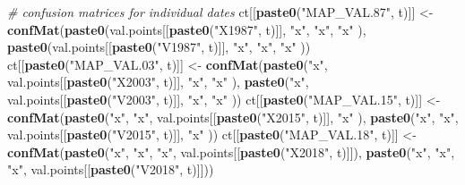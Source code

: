 \documentclass[a4paper, notitlepage, 12pt, krantz2]{krantz}
\newenvironment{Shaded}{\begin{snugshade}}{\end{snugshade}}
\newcommand{\CommentTok}[1]{\textcolor[rgb]{0.56,0.35,0.01}{\textit{#1}}}
\newcommand{\KeywordTok}[1]{\textcolor[rgb]{0.13,0.29,0.53}{\textbf{#1}}}
\newcommand{\NormalTok}[1]{#1}
\newcommand{\StringTok}[1]{\textcolor[rgb]{0.31,0.60,0.02}{#1}}
\begin{document}
\begin{Shaded}
\begin{Highlighting}[]
{{{{{{{{{  \CommentTok{# confusion matrices for individual dates}
\NormalTok{  ct[[}\KeywordTok{paste0}\NormalTok{(}\StringTok{"MAP_VAL.87"}\NormalTok{, t)]]          <-}\StringTok{ }\KeywordTok{confMat}\NormalTok{(}\KeywordTok{paste0}\NormalTok{(val.points[[}\KeywordTok{paste0}\NormalTok{(}\StringTok{"X1987"}\NormalTok{, t)]], }\StringTok{"x"}\NormalTok{,         }\StringTok{"x"}\NormalTok{,         }\StringTok{"x"}\NormalTok{        ), }\KeywordTok{paste0}\NormalTok{(val.points[[}\KeywordTok{paste0}\NormalTok{(}\StringTok{"V1987"}\NormalTok{, t)]], }\StringTok{"x"}\NormalTok{,         }\StringTok{"x"}\NormalTok{,         }\StringTok{"x"}\NormalTok{        ))}
\NormalTok{  ct[[}\KeywordTok{paste0}\NormalTok{(}\StringTok{"MAP_VAL.03"}\NormalTok{, t)]]          <-}\StringTok{ }\KeywordTok{confMat}\NormalTok{(}\KeywordTok{paste0}\NormalTok{(}\StringTok{"x"}\NormalTok{,         val.points[[}\KeywordTok{paste0}\NormalTok{(}\StringTok{"X2003"}\NormalTok{, t)]], }\StringTok{"x"}\NormalTok{,         }\StringTok{"x"}\NormalTok{        ), }\KeywordTok{paste0}\NormalTok{(}\StringTok{"x"}\NormalTok{,         val.points[[}\KeywordTok{paste0}\NormalTok{(}\StringTok{"V2003"}\NormalTok{, t)]], }\StringTok{"x"}\NormalTok{,         }\StringTok{"x"}\NormalTok{        ))}
\NormalTok{  ct[[}\KeywordTok{paste0}\NormalTok{(}\StringTok{"MAP_VAL.15"}\NormalTok{, t)]]          <-}\StringTok{ }\KeywordTok{confMat}\NormalTok{(}\KeywordTok{paste0}\NormalTok{(}\StringTok{"x"}\NormalTok{,         }\StringTok{"x"}\NormalTok{,         val.points[[}\KeywordTok{paste0}\NormalTok{(}\StringTok{"X2015"}\NormalTok{, t)]], }\StringTok{"x"}\NormalTok{        ), }\KeywordTok{paste0}\NormalTok{(}\StringTok{"x"}\NormalTok{,         }\StringTok{"x"}\NormalTok{,         val.points[[}\KeywordTok{paste0}\NormalTok{(}\StringTok{"V2015"}\NormalTok{, t)]], }\StringTok{"x"}\NormalTok{        ))}
\NormalTok{  ct[[}\KeywordTok{paste0}\NormalTok{(}\StringTok{"MAP_VAL.18"}\NormalTok{, t)]]          <-}\StringTok{ }\KeywordTok{confMat}\NormalTok{(}\KeywordTok{paste0}\NormalTok{(}\StringTok{"x"}\NormalTok{,         }\StringTok{"x"}\NormalTok{,         }\StringTok{"x"}\NormalTok{,         val.points[[}\KeywordTok{paste0}\NormalTok{(}\StringTok{"X2018"}\NormalTok{, t)]]), }\KeywordTok{paste0}\NormalTok{(}\StringTok{"x"}\NormalTok{,         }\StringTok{"x"}\NormalTok{,         }\StringTok{"x"}\NormalTok{,         val.points[[}\KeywordTok{paste0}\NormalTok{(}\StringTok{"V2018"}\NormalTok{, t)]]))}
  
}}}}}}}}}
\end{Highlighting}
\end{Shaded}
\end{document}
